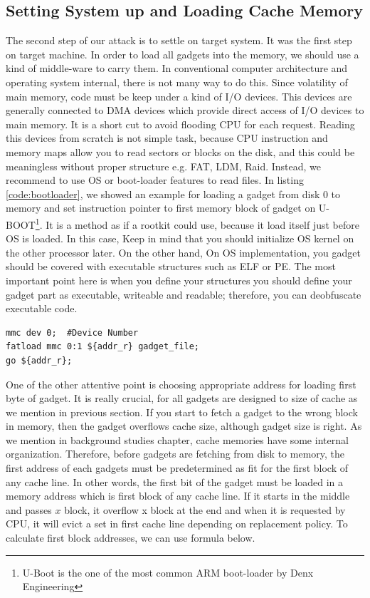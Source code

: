  	    \subsection{Setting System up and Loading Cache Memory} 
 	    	The second step of our attack is to settle on target system. It was the first step on target machine. In order to load all gadgets into the memory, we should use a kind of middle-ware to carry them. In conventional computer architecture and operating system internal, there is not many way to do this. Since volatility of main memory, code must be keep under a kind of I/O devices. This devices are generally connected to DMA devices which provide direct access of I/O devices to main memory. It is a short cut to avoid flooding CPU for each request\cite{mmap2011}. Reading this devices from scratch is not simple task, because CPU instruction and memory maps allow you to read sectors or blocks on the disk, and this could be meaningless without proper structure e.g. FAT, LDM, Raid. Instead, we recommend to use OS or boot-loader features to read files. In listing \ref{code:bootloader}, we showed an example for loading a gadget from disk 0 to memory and set instruction pointer to first memory block of gadget on U-BOOT\footnote{U-Boot is the one of the most common ARM boot-loader by Denx Engineering}. It is a method as if a rootkit could use, because it load itself just before OS is loaded. In this case, Keep in mind that you should initialize OS kernel on the other processor later. On the other hand, On OS implementation, you gadget should be covered with executable structures such as ELF or PE. The most important point here is when you define your structures you should define your gadget part as executable, writeable and readable; therefore, you can deobfuscate executable code.

 	    	\begin{lstlisting}[caption=The code example for loading a gadget from disk to memory and run it on U-Boot, label=code:bootloader]
mmc dev 0; 	#Device Number
fatload mmc 0:1 ${addr_r} gadget_file;
go ${addr_r};
 	    	\end{lstlisting}

 	    	One of the other attentive point is choosing appropriate address for loading first byte of gadget. It is really crucial, for all gadgets are designed to size of cache as we mention in previous section. If you start to fetch a gadget to the wrong block in memory, then the gadget overflows cache size, although gadget size is right. As we mention in background studies chapter, cache memories have some internal organization. Therefore, before gadgets are fetching from disk to memory, the first address of each gadgets must be predetermined as fit for the first block of any cache line. In other words, the first bit of the gadget must be loaded in a memory address which is first block of any cache line. If it starts in the middle and passes $x$ block, it overflow x block at the end and when it is requested by CPU, it will evict a set in first cache line depending on replacement policy. To calculate first block addresses, we can use formula below.

